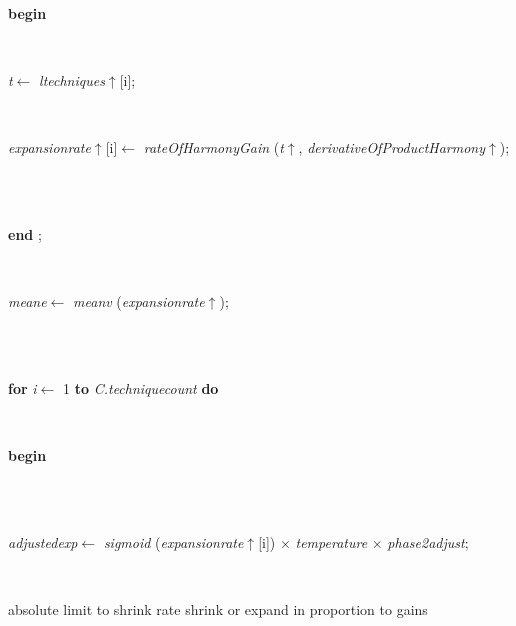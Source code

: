 \begin{tabbing}
\<\parbox{14cm}{\textsf{\textbf{begin} }}\\
\parbox{14cm}{\textsf{\textit{t}$\leftarrow$ \textit{ltechniques}$\uparrow$\textit{}[i]}; }\\
\parbox{14cm}{\textsf{\textit{expansionrate}$\uparrow$\textit{}[i]$\leftarrow$ \textit{rateOfHarmonyGain} (\textit{t}$\uparrow$\textit{}, \textit{derivativeOfProductHarmony}$\uparrow$\textit{})}; }\\
\\
\<\-\parbox{14cm}{\textsf{\textbf{end} ;}}\\
\parbox{14cm}{\textsf{\textit{meane}$\leftarrow$ \textit{meanv} (\textit{expansionrate}$\uparrow$\textit{})}; }\\
\\
\+\parbox{14cm}{\textsf {\textbf {for } \textsf{\textit{i}$\leftarrow$ 1} \textbf{ to } \textsf{\textit{C.techniquecount}} \textbf{ do } }}\\
\<\parbox{14cm}{\textsf{\textbf{begin} }}\\
\\
\parbox{14cm}{\textsf{\textit{adjustedexp}$\leftarrow$ \textit{sigmoid} (\textit{expansionrate}$\uparrow$\textit{}[i]) $\times$ \textit{temperature} $\times$ \textit{phase2adjust}}; }\\
\end{tabbing}
absolute limit to shrink rate
shrink or expand in proportion to gains
